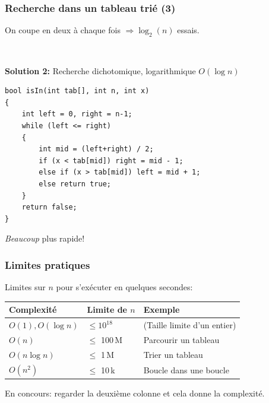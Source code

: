 \documentclass[12pt]{beamer}
\begin{document}
\begin{frame}[fragile]
\frametitle{Recherche dans un tableau trié (3)}
On coupe en deux à chaque fois $\Rightarrow \log_2(n)$ essais.

~

\textbf{Solution 2:} Recherche dichotomique, logarithmique $O(\log n)$
\begin{lstlisting}
bool isIn(int tab[], int n, int x)
{
    int left = 0, right = n-1;
    while (left <= right)
    {
        int mid = (left+right) / 2;
        if (x < tab[mid]) right = mid - 1;
        else if (x > tab[mid]) left = mid + 1;
        else return true;
    }
    return false;
}
\end{lstlisting}
\emph{Beaucoup} plus rapide!
\end{frame}

\begin{frame}
\frametitle{Limites pratiques}
Limites sur $n$ pour s'exécuter en quelques secondes:
\begin{center}
\begin{tabu}{lll}
    \toprule
    Complexité & Limite de $n$ & Exemple \\
    \midrule
    $O(1), O(\log n)$ & $\leq 10^{18}$ & (Taille limite d'un entier) \\
    $O(n)$ & $\leq$ 100\,M & Parcourir un tableau \\
    $O(n\log n)$ & $\leq$ 1\,M & Trier un tableau \\
    $O(n^2)$ & $\leq$ 10\,k & Boucle dans une boucle \\
    \bottomrule
\end{tabu}
\end{center}
En concours: regarder la deuxième colonne et cela donne la complexité.
\end{frame}
\end{document}
